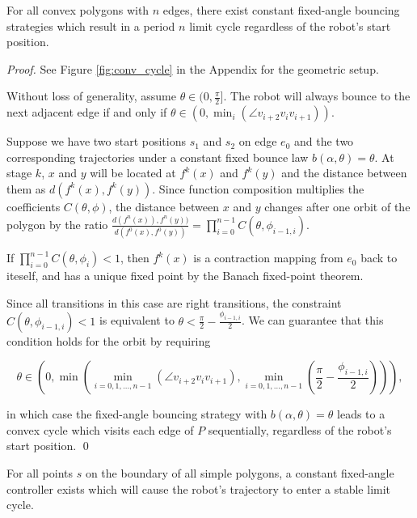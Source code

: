 \documentclass[]{styles/svproc}  %
\begin{document}
\begin{theorem} \label{thm:convex}
For all convex polygons with $n$ edges, there exist constant fixed-angle bouncing
strategies which result in a period $n$ limit cycle regardless of the robot's start position.
\end{theorem}
\begin{proof}
See Figure \ref{fig:conv_cycle} in the Appendix for the geometric setup.

Without loss of generality, assume $\theta \in (0, \frac{\pi}{2}]$. The robot will always bounce
to the next adjacent edge if and only if
$\theta \in (0, \min_{i}(\angle v_{i+2}v_{i}v_{i+1}))$.

Suppose we have two start positions $s_1$ and $s_2$ on edge $e_0$ and the two
corresponding trajectories under a constant fixed bounce law $b(\alpha, \theta) = \theta$.
At stage $k$, $x$ and $y$ will be located at $f^{k}(x)$ and
$f^{k}(y)$ and the distance between them as $d(f^{k}(x), f^{k}(y))$. Since function composition multiplies the coefficients $C(\theta, \phi)$, 
the distance between $x$ and $y$ changes after one orbit of the polygon by the
ratio $\frac{d(f^{n}(x)), f^{n}(y))}{d(f^{0}(x), f^{0}(y))} = \prod_{i = 0}^{n-1}
C(\theta, \phi_{i-1, i})$.

If $\prod_{i = 0}^{n-1} C(\theta, \phi_{i}) < 1$, then $f^k(x)$ is a contraction
mapping from $e_0$ back to iteself, and has a unique fixed point by the Banach fixed-point theorem\cite{Granas2003}.

Since all transitions in this case are right transitions, the constraint \\$C(\theta,\phi_{i-1, i})<1$ is equivalent to $\theta < \frac{\pi}{2}-\frac{\phi_{i-1, i}}{2}$. We can guarantee that this condition holds for the orbit by requiring

\begin{equation*}
\theta \in (0, \min(\min_{i = 0, 1, \dots, n-1}(\angle v_{i+2}v_{i}v_{i+1}),
\min_{i = 0, 1, \dots, n-1}(\frac{\pi}{2}-\frac{\phi_{i-1, i}}{2}))),
\end{equation*}

\noindent
in which case the fixed-angle bouncing strategy with $b(\alpha, \theta) = \theta$ leads to a convex
cycle which visits each edge of $P$ sequentially, regardless of the robot's start position.
\qed

\end{proof}

\begin{proposition} \label{prop:cycle}
For all points $s$ on the boundary of all simple polygons, a constant
fixed-angle controller exists which will cause the robot's trajectory to enter a
stable limit cycle.
\end{proposition}
\end{document}
